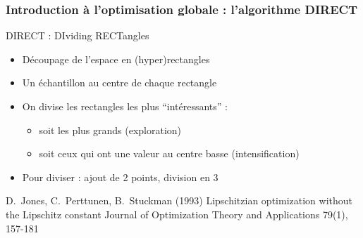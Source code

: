 \documentclass{beamer}
\begin{document}
\begin{frame}
  \frametitle{Introduction à l'optimisation globale : l'algorithme DIRECT}

  \begin{block}{DIRECT : DIviding RECTangles}
  \begin{itemize}
   \item Découpage de l'espace en (hyper)rectangles
   \item Un échantillon au centre de chaque rectangle
   \item On divise les rectangles les plus ``intéressants'' :
   \begin{itemize}
     \item soit les plus grands (exploration)
     \item soit ceux qui ont une valeur au centre basse (intensification)
   \end{itemize}
   \item Pour diviser : ajout de 2 points, division en 3
  \end{itemize}
  \end{block}
  \scriptsize{
 \begin{thebibliography}{7}
\beamertemplatearticlebibitems
     D.~Jones, C.~Perttunen, B.~Stuckman (1993)
         \newblock Lipschitzian optimization without the Lipschitz constant
         \newblock Journal of Optimization Theory and Applications 79(1), 157-181
 \end{thebibliography}
}
\normalsize
%   
\end{frame}
\end{document}
